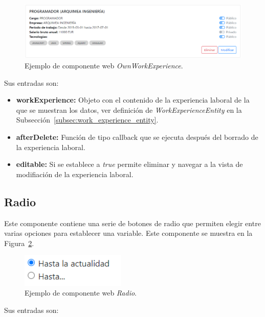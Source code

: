 \documentclass[a4paper, 12pt]{book}
\begin{document}
    \begin{figure}
        \centering
        \includegraphics[width=15cm, keepaspectratio]{img/OwnWorkExperience.PNG}
        \caption{Ejemplo de componente web \emph{OwnWorkExperience}.}\label{fig:component_own_work_experience}
    \end{figure}

    Sus entradas son:

    \begin{itemize}
        \item \textbf{workExperience:} Objeto con el contenido de la experiencia laboral de la que se muestran los datos, ver definición de \emph{WorkExperienceEntity} en la Subsección~\ref{subsec:work_experience_entity}.
        \item \textbf{afterDelete:} Función de tipo callback que se ejecuta después del borrado de la experiencia laboral.
        \item \textbf{editable:} Si se establece a \emph{true} permite eliminar y navegar a la vista de modifiación de la experiencia laboral.
    \end{itemize}

    \subsection{Radio}
    \label{subsec:wc_radio}
    Este componente contiene una serie de botones de radio que permiten elegir entre varias opciones para establecer una variable.
    Este componente se muestra en la Figura~\ref{fig:component_radio}.

    \begin{figure}
        \centering
        \includegraphics[width=5cm, keepaspectratio]{img/Radio.PNG}
        \caption{Ejemplo de componente web \emph{Radio}.}\label{fig:component_radio}
    \end{figure}

    Sus entradas son:
\end{document}
